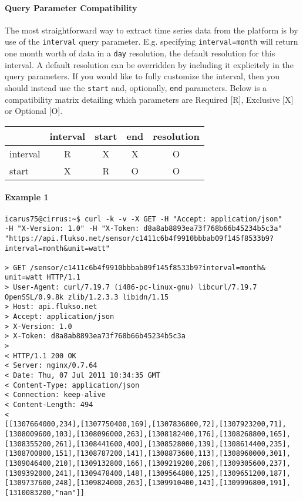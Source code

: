 \paragraph{Query Parameter Compatibility}
The most straightforward way to extract time series data from the platform is by use of the \texttt{interval} query parameter. E.g. specifying \texttt{interval=month} will return one month worth of data in a \texttt{day} resolution, the default resolution for this interval. A default resolution can be overridden by including it explicitely in the query parameters. If you would like to fully customize the interval, then you should instead use the \texttt{start} and, optionally, \texttt{end} parameters. Below is a compatibility matrix detailing which parameters are Required [R], Exclusive [X] or Optional [O]. 

\vspace{12pt}
\begin{center}
\begin{tabular}{l|c|c|c|c|}

& interval & start & end & resolution \\

\hline
interval & R & X & X & O \\

\hline
start    & X & R & O & O \\

\hline

\end{tabular}
\end{center}

\paragraph{Example 1}
\begin{Verbatim}
icarus75@cirrus:~$ curl -k -v -X GET -H "Accept: application/json"
-H "X-Version: 1.0" -H "X-Token: d8a8ab8893ea73f768b66b45234b5c3a"
"https://api.flukso.net/sensor/c1411c6b4f9910bbbab09f145f8533b9?
interval=month&unit=watt"

> GET /sensor/c1411c6b4f9910bbbab09f145f8533b9?interval=month&
unit=watt HTTP/1.1
> User-Agent: curl/7.19.7 (i486-pc-linux-gnu) libcurl/7.19.7
OpenSSL/0.9.8k zlib/1.2.3.3 libidn/1.15
> Host: api.flukso.net
> Accept: application/json
> X-Version: 1.0
> X-Token: d8a8ab8893ea73f768b66b45234b5c3a
> 
< HTTP/1.1 200 OK
< Server: nginx/0.7.64
< Date: Thu, 07 Jul 2011 10:34:35 GMT
< Content-Type: application/json
< Connection: keep-alive
< Content-Length: 494
< 
[[1307664000,234],[1307750400,169],[1307836800,72],[1307923200,71],
[1308009600,103],[1308096000,263],[1308182400,176],[1308268800,165],
[1308355200,261],[1308441600,400],[1308528000,139],[1308614400,235],
[1308700800,151],[1308787200,141],[1308873600,113],[1308960000,301],
[1309046400,210],[1309132800,166],[1309219200,286],[1309305600,237],
[1309392000,241],[1309478400,148],[1309564800,125],[1309651200,187],
[1309737600,248],[1309824000,263],[1309910400,143],[1309996800,191],
[1310083200,"nan"]]
\end{Verbatim}

